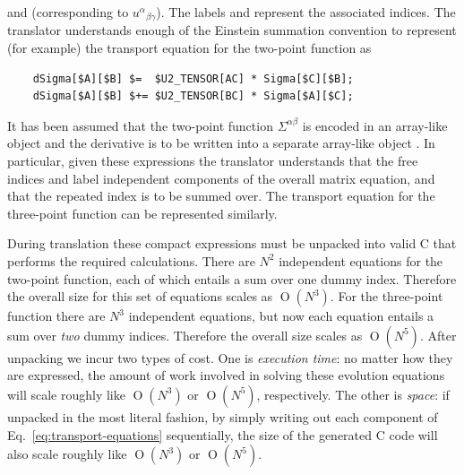 \documentclass[11pt,a4paper]{article}
\renewcommand{\texttt}[1]{{\ttfamily\fontseries{l}\selectfont{#1}}}
\newcommand{\token}[1]{{\footnotesize\color{orange}\texttt{\textbf{{\$}#1}}}}
\newcommand{\indexset}[1]{{\footnotesize\color{orange}\texttt{\textbf{[#1]}}}}
\DeclareMathOperator{\Or}{O}
\newcommand\CC{C\nolinebreak\hspace{-.05em}\raisebox{.4ex}{\relsize{-3}{\textbf{+}}}\nolinebreak\hspace{-.10em}\raisebox{.4ex}{\relsize{-3}{\textbf{+}}}}
\begin{document}
and \token{U3\_TENSOR[ABC]} (corresponding to ${u^\alpha}_{\beta\gamma}$).
The labels \indexset{AB} and \indexset{ABC} represent the associated indices.
The translator understands enough of the Einstein summation convention
to represent (for example) the transport equation for the two-point function
as
\begin{verbatim}
    dSigma[$A][$B] $=  $U2_TENSOR[AC] * Sigma[$C][$B];
    dSigma[$A][$B] $+= $U2_TENSOR[BC] * Sigma[$A][$C];    
\end{verbatim}
It has been assumed that the two-point function $\Sigma^{\alpha\beta}$ is
encoded in an array-like object \texttt{Sigma[][]}
and the derivative is to be written into a separate
array-like object \texttt{dSigma[][]}.
In particular, given these expressions the translator
understands that the free indices
\indexset{A} and \indexset{B}
label independent components of the
overall matrix equation,
and that the repeated index \indexset{C} is to be summed over.
The transport equation for the three-point function can
be represented similarly.

During translation these compact expressions must be unpacked into
valid {\CC} that performs the required calculations.
There are $N^2$ independent equations for the two-point function,
each of which entails a sum over one dummy index.
Therefore the overall size for this set of equations scales as $\Or(N^3)$.
For the three-point function there are $N^3$ independent equations,
but now each equation entails a sum over \emph{two} dummy indices.
Therefore the overall size scales as $\Or(N^5)$.
After unpacking we incur two types of cost.
One is \emph{execution time}:
no matter how they are expressed, the amount of work
involved in solving these evolution
equations will scale roughly like $\Or(N^3)$ or $\Or(N^5)$, respectively.
The other is \emph{space}:
if unpacked in the most literal fashion,
by simply writing out each component of Eq.~\eqref{eq:transport-equations}
sequentially,
the size of the generated {\CC} code will also scale roughly like
$\Or(N^3)$ or $\Or(N^5)$.
\end{document}
